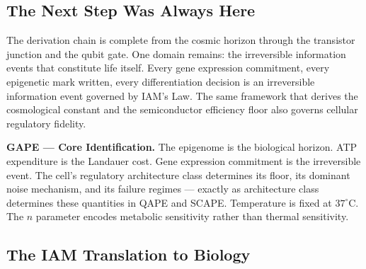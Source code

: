 \documentclass[12pt,a4paper]{article}
\begin{document}
\subsection{The Next Step Was Always Here}

The derivation chain is complete from the cosmic horizon through the transistor
junction and the qubit gate. One domain remains: the irreversible information
events that constitute life itself. Every gene expression commitment, every
epigenetic mark written, every differentiation decision is an irreversible
information event governed by IAM's Law. The same framework that derives the
cosmological constant and the semiconductor efficiency floor also governs
cellular regulatory fidelity.

\begin{keybox}
\textbf{GAPE --- Core Identification.}
The epigenome is the biological horizon.
ATP expenditure is the Landauer cost.
Gene expression commitment is the irreversible event.
The cell's regulatory architecture class determines its floor,
its dominant noise mechanism, and its failure regimes ---
exactly as architecture class determines these quantities
in QAPE and SCAPE.
Temperature is fixed at $37^\circ$C. The $n$ parameter
encodes metabolic sensitivity rather than thermal sensitivity.
\end{keybox}

\subsection{The IAM Translation to Biology}
\end{document}

